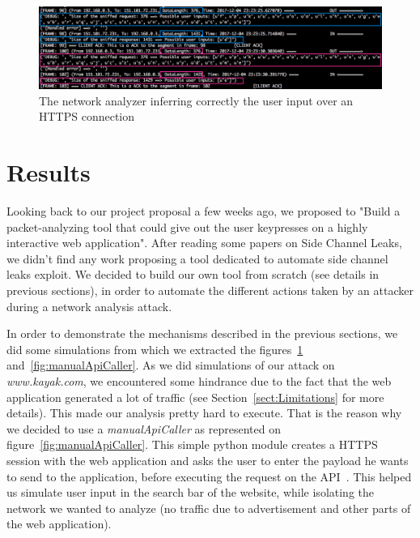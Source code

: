 \documentclass[runningheads]{llncs}
\begin{document}

\begin{figure}[h]
\centering
\includegraphics[width=\textwidth]{images/sniffingInference.png}
\caption{The network analyzer inferring correctly the user input over an HTTPS connection}
\label{fig:sniffingInference}
\end{figure}

\section{Results}

Looking back to our project proposal a few weeks ago, we proposed to "Build a packet-analyzing tool that could give out the user keypresses on a highly interactive web application". After reading some papers on Side Channel Leaks, we didn't find any work proposing a tool dedicated to automate side channel leaks exploit. We decided to build our own tool from scratch (see details in previous sections), in order to automate the different actions taken by an attacker during a network analysis attack.

\medskip

In order to demonstrate the mechanisms described in the previous sections, we did some simulations from which we extracted the figures~\ref{fig:sniffingInference} and~\ref{fig:manualApiCaller}. As we did simulations of our attack on \emph{www.kayak.com}, we encountered some hindrance due to the fact that the web application generated a lot of traffic (see Section~\ref{sect:Limitations} for more details). This made our analysis pretty hard to execute. That is the reason why we decided to use a \emph{manualApiCaller} as represented on figure~\ref{fig:manualApiCaller}. This simple python module creates a HTTPS session with the web application and asks the user to enter the payload he wants to send to the application, before executing the request on the API~. This helped us simulate user input in the search bar of the website, while isolating the network we wanted to analyze (no traffic due to advertisement and other parts of the web application).
\end{document}
